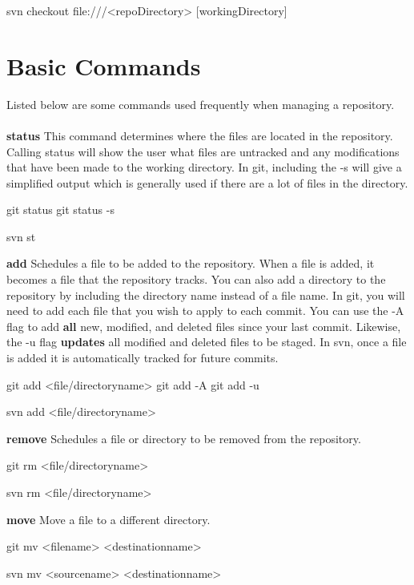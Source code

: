 \documentclass[oneside]{book}
\begin{document}
    \begin{svncode}
    svn checkout file:///<repoDirectory> [workingDirectory]
    \end{svncode}
    

\newpage
\section{Basic Commands}
Listed below are some commands used frequently when managing a repository.\\ \\
\textbf{status} This command determines where the files are located in the repository. Calling status will show the user what files are untracked and any modifications that have been made to the working directory. In git, including the -s will give a simplified output which is generally used if there are a lot of files in the directory. 
    \begin{gitcode}
    git status
    git status -s
    \end{gitcode}
    \begin{svncode}
    svn st
    \end{svncode}
\textbf{add} Schedules a file to be added to the repository. When a file is added, it becomes a file that the repository tracks. You can also add a directory to the repository by including the directory name instead of a file name. In git, you will need to add each file that you wish to apply to each commit. You can use the -A flag to add \textbf{all} new, modified, and deleted files since your last commit. Likewise, the -u flag \textbf{updates} all modified and deleted files to be staged.\newline
In svn, once a file is added it is automatically tracked for future commits.
    \begin{gitcode}
    git add <file/directoryname>
    git add -A
    git add -u
    \end{gitcode}
    \begin{svncode}
    svn add <file/directoryname>
    \end{svncode}
\textbf{remove} Schedules a file or directory to be removed from the repository. 
    \begin{gitcode}
    git rm <file/directoryname>
    \end{gitcode}
    \begin{svncode}
    svn rm <file/directoryname>
    \end{svncode}
\textbf{move} Move a file to a different directory.
    \begin{gitcode}
    git mv <filename> <destinationname>
    \end{gitcode}
    \begin{svncode}
    svn mv <sourcename> <destinationname>
    \end{svncode}
\end{document}
